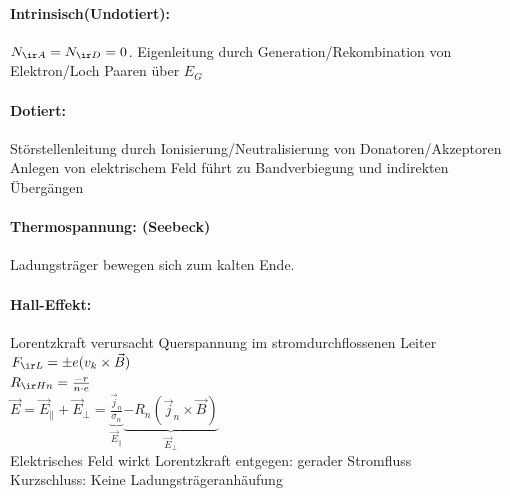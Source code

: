 \documentclass[fs, footer]{latex4ei}
\begin{document}
\begin{multicols*}{4}
{	\paragraph{Intrinsisch(Undotiert):}
	 $N_{\ir A} = N_{\ir D} = 0$. Eigenleitung durch Generation/Rekombination von Elektron/Loch Paaren über $E_{G}$

	\paragraph{Dotiert:} Störstellenleitung durch Ionisierung/Neutralisierung von Donatoren/Akzeptoren \\
	Anlegen von elektrischem Feld führt zu Bandverbiegung und indirekten Übergängen
	
	\paragraph{Thermospannung: (Seebeck)} Ladungsträger bewegen sich zum kalten Ende.\\
	
	\paragraph{Hall-Effekt:} Lorentzkraft verursacht Querspannung im stromdurchflossenen Leiter $F_{\ir L} = \pm e(v_k \times \vec B)$\\
	$R_{\ir Hn} = \frac{-r}{n \cdot e}$ \\
	$\vec E = \vec E_\parallel + \vec E_\perp = \underbrace{\frac{\vec j_n}{\sigma_n}}_{\vec E_\parallel} \underbrace{- R_n(\vec j_n \times \vec B)}_{\vec E_\perp}$\\
	Elektrisches Feld wirkt Lorentzkraft entgegen: gerader Stromfluss\\
	Kurzschluss: Keine Ladungsträgeranhäufung


	
}


\end{multicols*}
\end{document}

